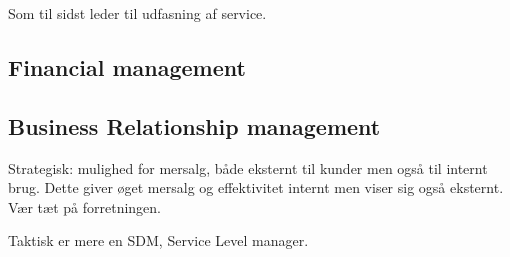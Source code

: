 Som til sidst leder til udfasning af service.

\subsection{Financial management}


\subsection{Business Relationship management}
Strategisk: mulighed for mersalg, både eksternt til kunder men også til internt brug. Dette giver øget mersalg og effektivitet internt men viser sig også eksternt. Vær tæt på forretningen.

Taktisk er mere en SDM, Service Level manager. 























%
%


